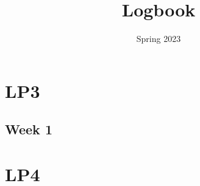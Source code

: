 \documentclass{article}
\title{Logbook}
\date{Spring 2023}
\newcommand{\logentry}[2]{
    \subsection{Week #2}
    
    \newpage
}
\begin{document}
\maketitle
\newpage
\tableofcontents
\newpage


\section{LP3}
    \logentry{3}{1}

\section{LP4}
\end{document}
